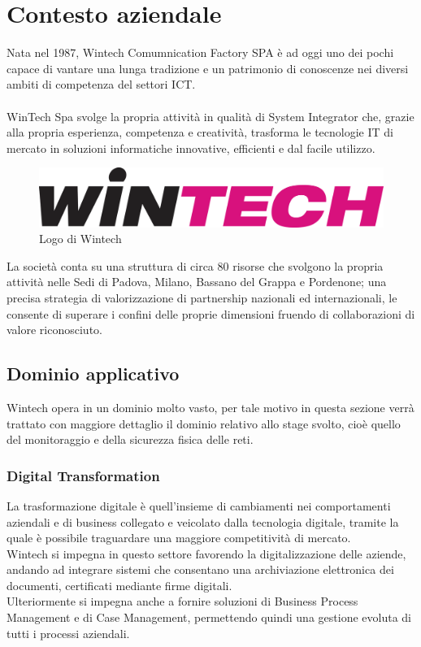 \documentclass[Tesi.tex]{subfiles}
\begin{document}
\setcounter{chapter}{0}
\chapter{Contesto aziendale}

Nata nel 1987, Wintech Comumnication Factory SPA è ad oggi uno dei pochi  capace di vantare una lunga tradizione e un patrimonio di conoscenze nei diversi ambiti di competenza del settori ICT. \\\\
WinTech Spa svolge la propria attività in qualità di System Integrator che, grazie alla propria esperienza, competenza e creatività, trasforma le tecnologie IT di mercato in soluzioni informatiche innovative, efficienti e dal facile utilizzo.\\
\begin{figure}[H]
	\centering
	\includegraphics[width=0.9\linewidth]{"images/LogoWintech"}
	\caption{Logo di Wintech}
	\label{fig:Logo di Wintech}
\end{figure}

La società conta su una struttura di circa 80 risorse che svolgono la propria attività nelle Sedi di Padova, Milano, Bassano del Grappa e Pordenone; una precisa strategia di valorizzazione di partnership nazionali ed internazionali, le consente di superare i confini delle proprie dimensioni fruendo di collaborazioni di valore riconosciuto.\\

\newpage
\section{Dominio applicativo}
Wintech opera in un dominio molto vasto, per tale motivo in questa sezione verrà trattato con maggiore dettaglio il dominio relativo allo stage svolto, cioè quello del monitoraggio e della sicurezza fisica delle reti. \\

\subsection{Digital Transformation}
La trasformazione digitale è quell'insieme di cambiamenti nei comportamenti aziendali e di business collegato e veicolato dalla tecnologia digitale, tramite la quale è possibile traguardare una maggiore competitività di mercato. \\
Wintech si impegna in questo settore favorendo la digitalizzazione delle aziende, andando ad integrare sistemi che consentano una archiviazione elettronica dei documenti, certificati mediante firme digitali. \\
Ulteriormente si impegna anche a fornire soluzioni di Business Process Management e di Case Management, permettendo quindi una gestione evoluta di tutti i processi aziendali.
\end{document}
